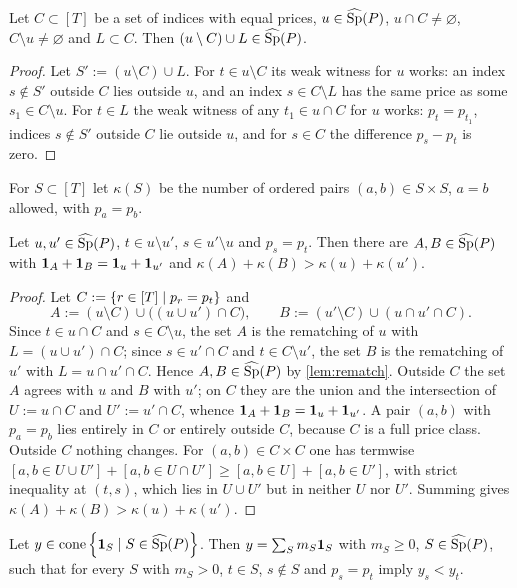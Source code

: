 \begin{lemma}[rematching]\label{lem:rematch}
Let $C\subset[T]$ be a set of indices with equal prices, $u\in\widehat{\operatorname{Sp}}(P)$, $u\cap C\ne\varnothing$, $C\setminus u\ne\varnothing$ and $L\subset C$. Then $(u\setminus C)\cup L\in\widehat{\operatorname{Sp}}(P)$.
\end{lemma}

\begin{proof}
Let $S':=(u\setminus C)\cup L$. For $t\in u\setminus C$ its weak witness for $u$ works: an index $s\notin S'$ outside $C$ lies outside $u$, and an index $s\in C\setminus L$ has the same price as some $s_1\in C\setminus u$. For $t\in L$ the weak witness of any $t_1\in u\cap C$ for $u$ works: $p_t=p_{t_1}$, indices $s\notin S'$ outside $C$ lie outside $u$, and for $s\in C$ the difference $p_s-p_t$ is zero.
\end{proof}

For $S\subset[T]$ let $\kappa(S)$ be the number of ordered pairs $(a,b)\in S\times S$, $a=b$ allowed, with $p_a=p_b$.

\begin{lemma}[uncrossing]\label{lem:uncross}
Let $u,u'\in\widehat{\operatorname{Sp}}(P)$, $t\in u\setminus u'$, $s\in u'\setminus u$ and $p_s=p_t$. Then there are $A,B\in\widehat{\operatorname{Sp}}(P)$ with $\mathbf 1_{A}+\mathbf 1_{B}=\mathbf 1_{u}+\mathbf 1_{u'}$ and $\kappa(A)+\kappa(B)>\kappa(u)+\kappa(u')$.
\end{lemma}

\begin{proof}
Let $C:=\left\{ r\in[T]\mid p_r=p_t \right\}$ and
\[
A:=(u\setminus C)\cup\bigl((u\cup u')\cap C\bigr),\qquad B:=(u'\setminus C)\cup(u\cap u'\cap C).
\]
Since $t\in u\cap C$ and $s\in C\setminus u$, the set $A$ is the rematching of $u$ with $L=(u\cup u')\cap C$; since $s\in u'\cap C$ and $t\in C\setminus u'$, the set $B$ is the rematching of $u'$ with $L=u\cap u'\cap C$. Hence $A,B\in\widehat{\operatorname{Sp}}(P)$ by \cref{lem:rematch}. Outside $C$ the set $A$ agrees with $u$ and $B$ with $u'$; on $C$ they are the union and the intersection of $U:=u\cap C$ and $U':=u'\cap C$, whence $\mathbf 1_{A}+\mathbf 1_{B}=\mathbf 1_{u}+\mathbf 1_{u'}$. A pair $(a,b)$ with $p_a=p_b$ lies entirely in $C$ or entirely outside $C$, because $C$ is a full price class. Outside $C$ nothing changes. For $(a,b)\in C\times C$ one has termwise $[a,b\in U\cup U']+[a,b\in U\cap U']\ge[a,b\in U]+[a,b\in U']$, with strict inequality at $(t,s)$, which lies in $U\cup U'$ but in neither $U$ nor $U'$. Summing gives $\kappa(A)+\kappa(B)>\kappa(u)+\kappa(u')$.
\end{proof}

\begin{lemma}\label{lem:monotone}
Let $y\in\operatorname{cone}\left\{ \mathbf 1_{S}\mid S\in\widehat{\operatorname{Sp}}(P) \right\}$. Then $y=\sum_Sm_S\mathbf 1_{S}$ with $m_S\ge0$, $S\in\widehat{\operatorname{Sp}}(P)$, such that for every $S$ with $m_S>0$, $t\in S$, $s\notin S$ and $p_s=p_t$ imply $y_s<y_t$.
\end{lemma}

